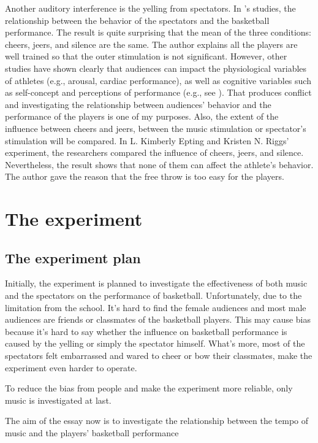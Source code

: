 \documentclass{article}
\begin{document}
Another auditory interference is the yelling from spectators. In \textcite{eptingCheersVsJeers}'s studies, the relationship between the behavior of the spectators and the basketball performance. The result is quite surprising that the mean of the three conditions: cheers, jeers, and silence are the same. The author explains all the players are well trained so that the outer stimulation is not significant. However, other studies have shown clearly that audiences can impact the physiological variables of athletes (e.g., arousal, cardiac performance), as well as cognitive variables such as self-concept and perceptions of performance  (e.g., see \textcite{jonesAllWorldStage2007}). That produces conflict and investigating the relationship between audiences' behavior and the performance of the players is one of my purposes. Also, the extent of the influence between cheers and jeers, between the music stimulation or spectator's stimulation will be compared. In L. Kimberly Epting and Kristen N. Riggs' experiment,  the researchers compared the influence of cheers, jeers, and silence.\autocite{eptingCheersVsJeers} Nevertheless, the result shows that none of them can affect the athlete's behavior. The author gave the reason that the free throw is too easy for the players.

\section{The experiment}

\subsection{The experiment plan}
Initially, the experiment is planned to investigate the effectiveness of both music and the spectators on the performance of basketball. Unfortunately, due to the limitation from the school. It's hard to find the female audiences and most male audiences are friends or classmates of the basketball players. This may cause bias because it's hard to say whether the influence on basketball performance is caused by the yelling or simply the spectator himself. What's more, most of the spectators felt embarrassed and wared to cheer or bow their classmates, make the experiment even harder to operate.

To reduce the bias from people and make the experiment more reliable, only music is investigated at last. 

The aim of the essay now is to investigate the relationship between the tempo of music and the players' basketball performance
\end{document}
